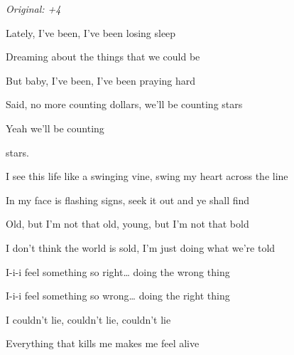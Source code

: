 \begin{song}


\begin{strumbox}
\textit{Original: +4}
\end{strumbox}

\begin{vchordbox}
\vspace{2em}
\end{vchordbox}

\large

\bigskip

Lately, I've been, I've been losing sleep \par
{} Dreaming about the things that we could be \par
But baby, I've been, I've been praying hard \par
{} Said, no more counting dollars, we'll be counting stars \par
{} Yeah we'll be counting  \par

\bigskip

stars.    \par

\bigskip

I see this life like a swinging vine, swing my heart across the line \par
{}In my face is flashing signs,  seek it out and ye shall find \par
{}Old, but I'm not that old, young, but I'm not that bold \par
{}I don't think the world is sold,  I'm just doing what we're told \par

\bigskip

 I-i-i feel something so right… doing the wrong thing \par
{} I-i-i feel something so wrong… doing the right thing \par
{} I couldn't lie, couldn't lie, couldn't lie \par
{}Everything that kills me makes me feel alive \par

\bigskip


\end{song}
